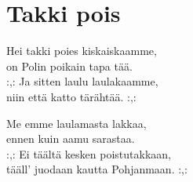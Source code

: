 \section{Takki pois}

Hei takki poies kiskaiskaamme,\\
on Polin poikain tapa tää.\\
:,: Ja sitten laulu laulakaamme,\\
niin että katto tärähtää. :,:


Me emme laulamasta lakkaa,\\
ennen kuin aamu sarastaa.\\
:,: Ei täältä kesken poistutakkaan,\\
tääll’ juodaan kautta Pohjanmaan. :,: